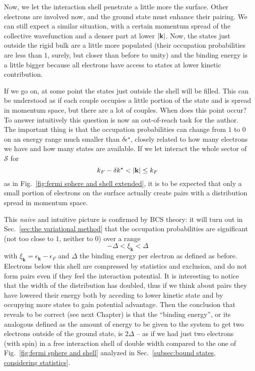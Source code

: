 Now, we let the interaction shell penetrate a little more the surface. Other electrons are involved now, and the ground state must enhance their pairing. We can still expect a similar situation, with a certain momentum spread of the collective wavefunction and a denser part at lower $\abs{\mathbf{k}}$. Now, the states just outside the rigid bulk are a little more populated (their occupation probabilities are less than $1$, surely, but closer than before to unity) and the binding energy is a little bigger because all electrons have access to states at lower kinetic contribution.

If we go on, at some point the states just outside the shell will be filled. This can be understood as if each couple occupies a little portion of the state and is spread in momentum space, but there are a lot of couples. When does this point occur? To answer intuitively this question is now an out-of-reach task for the author. The important thing is that the occupation probabilities can change from $1$ to $0$ on an energy range much smaller than $\delta\epsilon^\star$, closely related to how many electrons we have and how many states are available. If we let interact the whole sector of $\mathcal{S}$ for
\[
	k_F - \delta k^\star < \abs{\mathbf{k}} \le k_F
\]
as in Fig.~\ref{fig:fermi sphere and shell extended}, it is to be expected that only a small portion of electrons on the surface actually create pairs with a distribution spread in momentum space.

This \textit{naive} and intuitive picture is confirmed by BCS theory: it will turn out in Sec.~\ref{sec:the variational method} that the occupation probabilities are significant (not too close to $1$, neither to $0$) over a range
\[
	- \Delta < \xi_\mathbf{k} < \Delta
\]
with $\xi_\mathbf{k} = \epsilon_\mathbf{k} - \epsilon_F$ and $\Delta$ the binding energy per electron as defined as before. Electrons below this shell are compressed by statistics and exclusion, and do not form pairs even if they feel the interaction potential. It is interesting to notice that the width of the distribution has doubled, thus if we think about pairs they have lowered their energy both by acceding to lower kinetic state and by occupying more states to gain potential advantage. Then the conclusion that reveals to be correct (see next Chapter) is that the ``binding energy'', or its analogous defined as the amount of energy to be given to the system to get two electrons outside of the ground state, is $2\Delta$ -- as if we had just two electrons (with spin) in a free interaction shell of double width compared to the one of Fig.~\ref{fig:fermi sphere and shell} analyzed in Sec.~\ref{subsec:bound states, considering statistics}.

